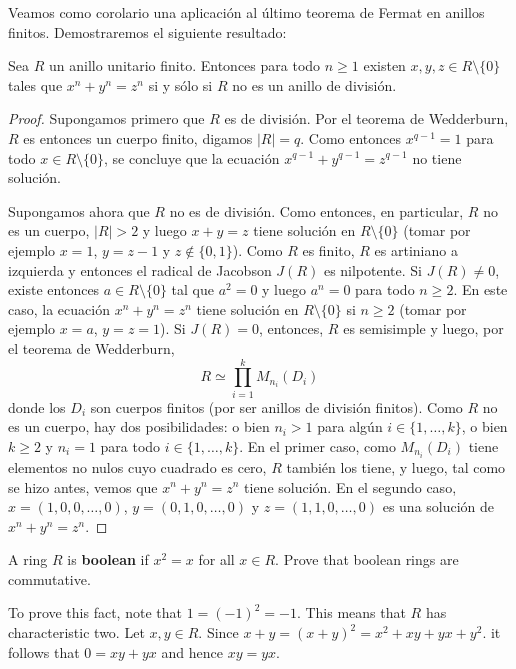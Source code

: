 Veamos como corolario una aplicación al último teorema de Fermat en anillos
finitos. Demostraremos el siguiente resultado:

\begin{theorem}
	Sea $R$ un anillo unitario finito. Entonces para todo $n\geq1$ existen $x,y,z\in
	R\setminus\{0\}$ tales que $x^n+y^n=z^n$ si y sólo si $R$ no es un anillo
	de división.
\end{theorem}

\begin{proof}
	Supongamos primero que $R$ es de división. Por el teorema de Wedderburn,
	$R$ es entonces un cuerpo finito, digamos $|R|=q$. Como entonces
	$x^{q-1}=1$ para todo $x\in R\setminus\{0\}$, se concluye que la ecuación
	$x^{q-1}+y^{q-1}=z^{q-1}$ no tiene solución.

	Supongamos ahora que $R$ no es de división. Como entonces, en particular,
	$R$ no es un cuerpo, $|R|>2$ y luego $x+y=z$ tiene solución en
	$R\setminus\{0\}$ (tomar por ejemplo $x=1$, $y=z-1$ y $z\not\in\{0,1\}$).
	Como $R$ es finito, $R$ es artiniano a izquierda y entonces el radical de
	Jacobson $J(R)$ es nilpotente. Si $J(R)\ne 0$, existe entonces $a\in
	R\setminus\{0\}$ tal que $a^2=0$ y luego $a^n=0$ para todo $n\geq2$. En
	este caso, la ecuación $x^n+y^n=z^n$ tiene solución en $R\setminus\{0\}$ si
	$n\geq 2$ (tomar por ejemplo $x=a$, $y=z=1$). Si $J(R)=0$, entonces, $R$ es
	semisimple y luego, por el teorema de Wedderburn,
	\[
		R\simeq \prod_{i=1}^k M_{n_i}(D_i)
	\]
	donde los $D_i$ son cuerpos finitos (por ser anillos de división finitos).
	Como $R$ no es un cuerpo, hay dos posibilidades: o bien $n_i>1$ para algún
	$i\in\{1,\dots,k\}$, o bien $k\geq 2$ y $n_i=1$ para todo
	$i\in\{1,\dots,k\}$. En el primer caso, como $M_{n_i}(D_i)$ tiene elementos
	no nulos cuyo cuadrado es cero, $R$ también los tiene, y luego, tal como se
	hizo antes, vemos que $x^n+y^n=z^n$ tiene solución. En el segundo caso,
	$x=(1,0,0,\dots,0)$, $y=(0,1,0,\dots,0)$ y $z=(1,1,0,\dots,0)$ es una
	solución de $x^n+y^n=z^n$.
\end{proof}



\begin{exercise}
    A ring $R$ is \textbf{boolean} if $x^2=x$ for all $x\in R$. 
    Prove that boolean rings are commutative. 
\end{exercise}

To prove this fact, note that $1=(-1)^2=-1$. This means that $R$ has
characteristic two. Let $x,y\in R$. Since $x+y=(x+y)^2=x^2+xy+yx+y^2$. 
it follows that $0=xy+yx$ and hence $xy=yx$.

